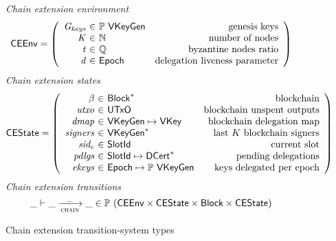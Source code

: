 \begin{figure}
  \emph{Chain extension environment}
  \begin{equation*}
    \CEEnv =
    \left(
      \begin{array}{r@{~\in~}lr}
        \var{\Gkeys} & \powerset{\VKeyGen} & \text{genesis keys}\\
        \var{K} & \mathbb{N} & \text{number of nodes}\\
        \var{t} & \mathbb{Q} & \text{byzantine nodes ratio}\\
        \var{d} & \Epoch & \text{delegation liveness parameter}\\
      \end{array}
    \right)
  \end{equation*}
  \emph{Chain extension states}
  \begin{equation*}
    \CEState =
    \left(
      \begin{array}{r@{~\in~}lr}
        \beta & \seqof{\Block} & \text{blockchain}\\
        \var{utxo} & \UTxO & \text{blockchain unspent outputs}\\
        \var{dmap} & \VKeyGen \mapsto \VKey & \text{blockchain delegation map}\\
        \var{signers} & \seqof{\VKeyGen} & \text{last $K$ blockchain signers}\\
        \var{sid_c} & \SlotId & \text{current slot}\\
        \var{pdlgs} & \SlotId \mapsto \seqof{\DCert} & \text{pending delegations}\\
        \var{ekeys} & \Epoch \mapsto \powerset{\VKeyGen} & \text{keys delegated per epoch}
      \end{array}
    \right)
  \end{equation*}
  \emph{Chain extension transitions}
  \begin{equation*}
    \_ \vdash \_ \trans{chain}{\_} \_ \in
      \powerset (\CEEnv \times \CEState \times \Block \times \CEState)
  \end{equation*}
  \caption{Chain extension transition-system types}
  \label{fig:ts-types:chain-extension}
\end{figure}

